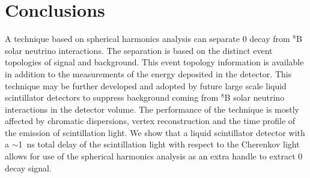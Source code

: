 \section{Conclusions}
A technique based on spherical harmonics analysis can
separate 0{\nbb} decay from $^{8}$B solar neutrino interactions. The
separation is based on the distinct event topologies of signal and
background. This event topology information is available in addition
to the measurements of the energy deposited in the detector. This
technique may be further developed and adopted by future large scale
liquid scintillator detectors to suppress background coming from
$^{8}$B solar neutrino interactions in the detector volume. The
performance of the technique is mostly affected by chromatic
dispersions, vertex reconstruction and the time profile of the emission of scintillation light. We show that a liquid scintillator detector
with a $\sim$1~ns total delay of the scintillation light with respect
to the Cherenkov light allows for use of the spherical harmonics analysis
as an extra handle to extract 0{\nbb} decay signal.
